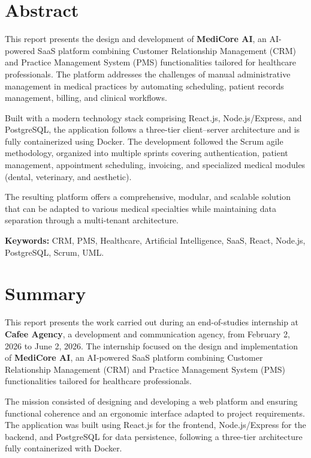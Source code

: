 \documentclass[12pt,a4paper,oneside]{report}
\begin{document}
\chapter*{Abstract}

This report presents the design and development of \textbf{MediCore AI}, an AI-powered SaaS platform combining Customer Relationship Management (CRM) and Practice Management System (PMS) functionalities tailored for healthcare professionals. The platform addresses the challenges of manual administrative management in medical practices by automating scheduling, patient records management, billing, and clinical workflows.

Built with a modern technology stack comprising React.js, Node.js/Express, and PostgreSQL, the application follows a three-tier client--server architecture and is fully containerized using Docker. The development followed the Scrum agile methodology, organized into multiple sprints covering authentication, patient management, appointment scheduling, invoicing, and specialized medical modules (dental, veterinary, and aesthetic).

The resulting platform offers a comprehensive, modular, and scalable solution that can be adapted to various medical specialties while maintaining data separation through a multi-tenant architecture.

\textbf{Keywords:} CRM, PMS, Healthcare, Artificial Intelligence, SaaS, React, Node.js, PostgreSQL, Scrum, UML.

\newpage

\chapter*{Summary}

This report presents the work carried out during an end-of-studies internship at \textbf{Cafee Agency}, a development and communication agency, from February 2, 2026 to June 2, 2026. The internship focused on the design and implementation of \textbf{MediCore AI}, an AI-powered SaaS platform combining Customer Relationship Management (CRM) and Practice Management System (PMS) functionalities tailored for healthcare professionals.

The mission consisted of designing and developing a web platform and ensuring functional coherence and an ergonomic interface adapted to project requirements. The application was built using React.js for the frontend, Node.js/Express for the backend, and PostgreSQL for data persistence, following a three-tier architecture fully containerized with Docker.
\end{document}
